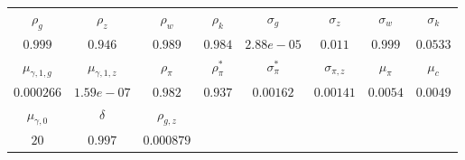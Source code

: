 \begin{tabular}{cccccccc} \\ \hline$\rho_g$&$\rho_z$&$\rho_w$&$\rho_k$&$\sigma_g$&$\sigma_z$&$\sigma_w$&$\sigma_k$\\$0.999$&$0.946$&$0.989$&$0.984$&$2.88e-05$&$0.011$&$0.999$&$0.0533$\\ \hline$\mu_{\gamma,1,g}$&$\mu_{\gamma,1,z}$&$\rho_\pi$&$\rho_{\pi}^*$&$\sigma_{\pi}^*$&$\sigma_{\pi,z}$&$\mu_\pi$&$\mu_c$\\$0.000266$&$1.59e-07$&$0.982$&$0.937$&$0.00162$&$0.00141$&$0.0054$&$0.0049$\\ \hline$\mu_{\gamma,0}$&$\delta$&$\rho_{g,z}$\\$20$&$0.997$&$0.000879$\\ \hline \end{tabular}